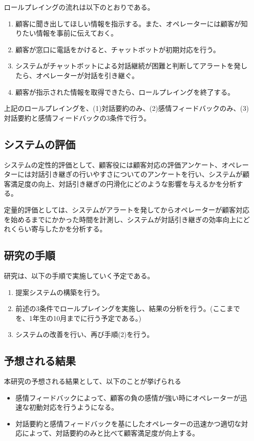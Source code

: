 \documentclass[a4j,10pt, twocolumn]{jarticle}
\begin{document}
ロールプレイングの流れは以下のとおりである。
\begin{enumerate}[label=(\arabic*), topsep=5pt, itemsep=0pt, partopsep=0pt, parsep=0pt]
    \item 顧客に聞き出してほしい情報を指示する。また、オペレーターには顧客が知りたい情報を事前に伝えておく。
    \item 顧客が窓口に電話をかけると、チャットボットが初期対応を行う。
    \item システムがチャットボットによる対話継続が困難と判断してアラートを発したら、オペレーターが対話を引き継ぐ。
    \item 顧客が指示された情報を取得できたら、ロールプレイングを終了する。
\end{enumerate}

上記のロールプレイングを、(1)対話要約のみ、(2)感情フィードバックのみ、(3)対話要約と感情フィードバックの3条件で行う。

\subsection{システムの評価}
システムの定性的評価として、顧客役には顧客対応の評価アンケート、オペレーターには対話引き継ぎの行いやすさについてのアンケートを行い、システムが顧客満足度の向上、対話引き継ぎの円滑化にどのような影響を与えるかを分析する。

定量的評価としては、システムがアラートを発してからオペレーターが顧客対応を始めるまでにかかった時間を計測し、システムが対話引き継ぎの効率向上にどれくらい寄与したかを分析する。

\subsection{研究の手順}
研究は、以下の手順で実施していく予定である。
\begin{enumerate}[label=(\arabic*), topsep=5pt, itemsep=0pt, partopsep=0pt, parsep=0pt]
    \item 提案システムの構築を行う。
    \item 前述の3条件でロールプレイングを実施し、結果の分析を行う。(ここまでを、1年生の10月までに行う予定である。)
    \item システムの改善を行い、再び手順(2)を行う。
\end{enumerate}

\subsection{予想される結果}
本研究の予想される結果として、以下のことが挙げられる
\begin{itemize}[topsep=0pt, itemsep=0pt, partopsep=0pt, parsep=0pt]
    \item 感情フィードバックによって、顧客の負の感情が強い時にオペレーターが迅速な初動対応を行うようになる。
    \item 対話要約と感情フィードバックを基にしたオペレーターの迅速かつ適切な対応によって、対話要約のみと比べて顧客満足度が向上する。
\end{itemize}
\end{document}

